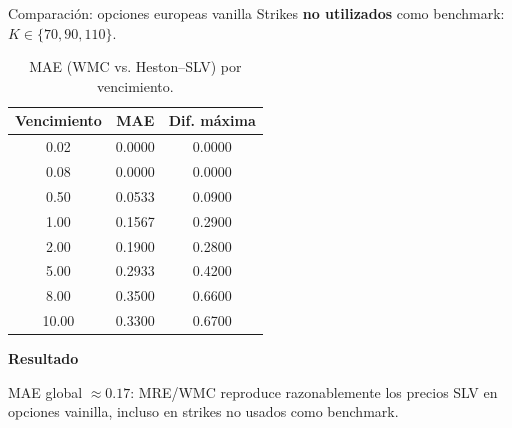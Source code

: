 \documentclass[8pt]{beamer}
\begin{document}
\begin{frame}{Comparación: opciones europeas vanilla}
    Strikes \textbf{no utilizados} como benchmark: $K \in \{70, 90, 110\}$.
    
    \begin{table}
    \centering
    \small
    \begin{tabular}{|c|c|c|}
    \hline
     \textbf{Vencimiento} & \textbf{MAE} & \textbf{Dif. máxima} \\
    \hline
     0.02  & 0.0000 & 0.0000 \\
     0.08  & 0.0000 & 0.0000 \\
     0.50  & 0.0533 & 0.0900 \\
     1.00  & 0.1567 & 0.2900 \\
     2.00  & 0.1900 & 0.2800 \\
     5.00  & 0.2933 & 0.4200 \\
     8.00  & 0.3500 & 0.6600 \\
     10.00 & 0.3300 & 0.6700 \\
    \hline
    \end{tabular}
    \caption{MAE (WMC vs. Heston--SLV) por vencimiento.}
    \end{table}
    \pause
    
    \textbf{Resultado}

MAE global $\approx 0.17$: MRE/WMC reproduce razonablemente los precios SLV en opciones vainilla, incluso en strikes no usados como benchmark.

\end{frame}
\end{document}
